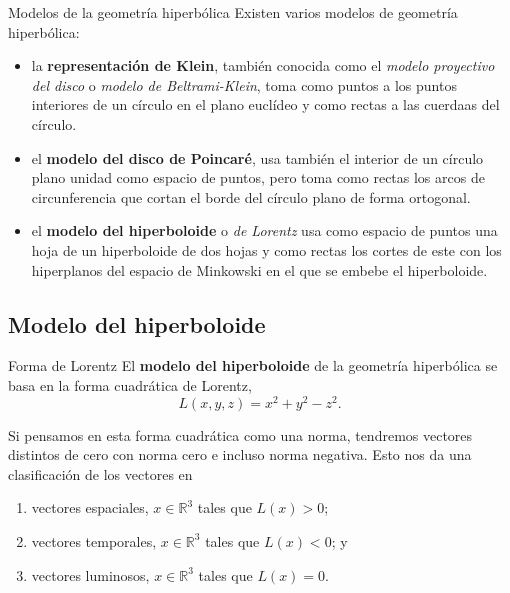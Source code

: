 \documentclass[compress]{beamer}
\begin{document}
\begin{frame}{Modelos de la geometría hiperbólica}
  Existen varios modelos de geometría hiperbólica:

  \begin{itemize}
  \item la \textbf{representación de Klein}, también conocida como el
    \textit{modelo proyectivo del disco} o \textit{modelo de
      Beltrami-Klein}, toma como puntos a los puntos interiores de
    un círculo en el plano euclídeo y como rectas a las cuerdaas del
    círculo.
    \pause
  
  \item el \textbf{modelo del disco de Poincaré}, usa también el
    interior de un círculo plano unidad como espacio de puntos,
    pero toma como rectas los arcos de circunferencia que cortan el
    borde del círculo plano de forma ortogonal.
    \pause
  
  \item el \textbf{modelo del hiperboloide} o \textit{de Lorentz} usa
    como espacio de puntos una hoja de un hiperboloide de dos hojas
    y como rectas los cortes de este con los hiperplanos del espacio
    de Minkowski en el que se embebe el hiperboloide.
  \end{itemize}
\end{frame}

\subsection{Modelo del hiperboloide}
\begin{frame}{Forma de Lorentz}
  El \textbf{modelo del hiperboloide} de la geometría hiperbólica se
  basa en la forma cuadrática de Lorentz,
  \[L(x,y,z)=x^2+y^2-z^2.\]

  Si pensamos en esta forma cuadrática como una norma, tendremos vectores
  distintos de cero con norma cero e incluso norma negativa. Esto nos da
  una clasificación de los vectores en

  \begin{enumerate}
  \item vectores espaciales, $x\in\mathbb{R}^3$ tales que $L(x)>0$; \pause
  \item vectores temporales, $x\in\mathbb{R}^3$ tales que $L(x)<0$; y \pause
  \item vectores luminosos, $x\in\mathbb{R}^3$ tales que $L(x)=0$.
  \end{enumerate}
\end{frame}
\end{document}
